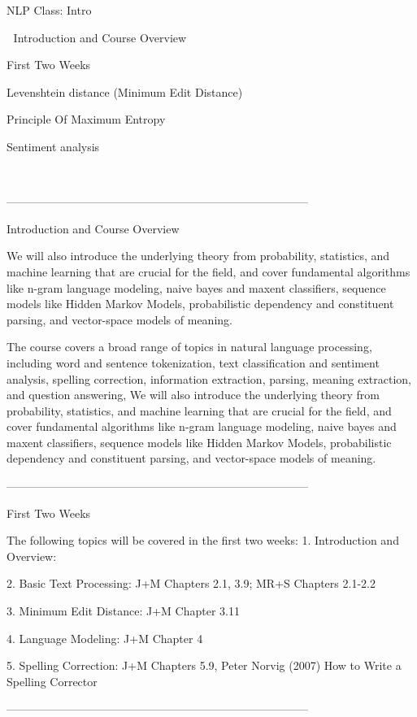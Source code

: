 
NLP Class: Intro



Introduction and Course Overview

First Two Weeks

Levenshtein distance (Minimum Edit Distance)

Principle Of Maximum Entropy

Sentiment analysis




--------------------------------------------------------------------------------



Introduction and Course Overview


We will also introduce the underlying theory from probability, statistics, and machine learning that are crucial for the field, and cover fundamental algorithms like n-gram language modeling, naive bayes and maxent classifiers, sequence models like Hidden Markov Models, probabilistic dependency and constituent parsing, and vector-space models of meaning.


The course covers a broad range of topics in natural language processing, including word and sentence tokenization, text classification and sentiment analysis, spelling correction, information extraction, parsing, meaning extraction, and question answering, We will also introduce the underlying theory from probability, statistics, and machine learning that are crucial for the field, and cover fundamental algorithms like n-gram language modeling, naive bayes and maxent classifiers, sequence models like Hidden Markov Models, probabilistic dependency and constituent parsing, and vector-space models of meaning.



--------------------------------------------------------------------------------


First Two Weeks


The following topics will be covered in the first two weeks:
1.
Introduction and Overview:

2.
Basic Text Processing: J+M Chapters 2.1, 3.9; MR+S Chapters 2.1-2.2

3.
Minimum Edit Distance: J+M Chapter 3.11

4.
Language Modeling: J+M Chapter 4

5.
Spelling Correction: J+M Chapters 5.9, Peter Norvig (2007) How to Write a Spelling Corrector




--------------------------------------------------------------------------------


